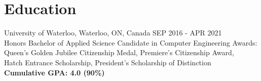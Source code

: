 \documentclass[]{friggeri-cv}
\begin{document}
\section{Education}

\begin{entrylist}
	\entry
	{\vspace{0.1cm}University of Waterloo, Waterloo, ON, Canada \hfill{\normalfont\footnotesize{}SEP 2016 - APR 2021}}
	{\\{\vspace{0.1cm}\normalsize\normalfont Honors Bachelor of Applied Science Candidate in Computer Engineering}}
	{
		Awards: Queen's Golden Jubilee Citizenship Medal, Premiere's Citizenship Award, \\
		\vspace{0.2cm}\hspace{1.3cm} Hatch Entrance Scholarship, President's Scholarship of Distinction \\
		\textbf{{Cumulative GPA: 4.0 (90\%)}}
	}
\end{entrylist}

% 
\end{document}
